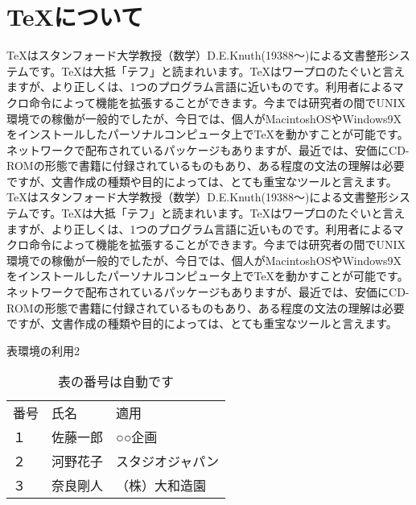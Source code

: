 \documentclass[twocolumn,10pt]{jarticle}
\begin{document}
\section{\TeX について}
TeXはスタンフォード大学教授（数学）D.E.Knuth(19388～)による文書整形システムです。TeXは大抵「テフ」と読まれいます。TeXはワープロのたぐいと言えますが、より正しくは、1つのプログラム言語に近いものです。利用者によるマクロ命令によって機能を拡張することができます。今までは研究者の間でUNIX環境での稼働が一般的でしたが、今日では、個人がMacintoshOSやWindows9Xをインストールしたパーソナルコンピュータ上でTeXを動かすことが可能です。ネットワークで配布されているパッケージもありますが、最近では、安価にCD-ROMの形態で書籍に付録されているものもあり、ある程度の文法の理解は必要ですが、文書作成の種類や目的によっては、とても重宝なツールと言えます。
TeXはスタンフォード大学教授（数学）D.E.Knuth(19388～)による文書整形システムです。TeXは大抵「テフ」と読まれいます。TeXはワープロのたぐいと言えますが、より正しくは、1つのプログラム言語に近いものです。利用者によるマクロ命令によって機能を拡張することができます。今までは研究者の間でUNIX環境での稼働が一般的でしたが、今日では、個人がMacintoshOSやWindows9Xをインストールしたパーソナルコンピュータ上でTeXを動かすことが可能です。ネットワークで配布されているパッケージもありますが、最近では、安価にCD-ROMの形態で書籍に付録されているものもあり、ある程度の文法の理解は必要ですが、文書作成の種類や目的によっては、とても重宝なツールと言えます。

表環境の利用2
\begin{table}[h]
\begin{center}
\caption{表の番号は自動です}
\label{tbl:a1}
\begin{tabular}{|l|l|l|}
\hline
番号 & 氏名 & 適用 \\
\cline{1-3}
１ & 佐藤一郎 & ○○企画 \\
\hline
２ & 河野花子 & スタジオジャパン \\
\hline
３ & 奈良剛人 & （株）大和造園 \\
\hline
\end{tabular}
\end{center}
\end{table}
\end{document}
